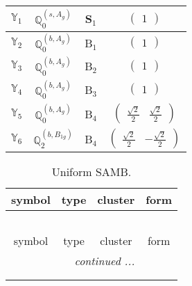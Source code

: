 \documentclass[fleqn,10pt,landscape]{article}
\begin{document}
\begin{itemize}
\begin{center}
\begin{longtable}{c|c|c|c}
$ \mathbb{Y}_{1} $ & $\mathbb{Q}_{0}^{(s,A_{g})}$ & S$_{1}$ & $\begin{pmatrix} 1 \end{pmatrix}$ \\ \hline
$ \mathbb{Y}_{2} $ & $\mathbb{Q}_{0}^{(b,A_{g})}$ & B$_{1}$ & $\begin{pmatrix} 1 \end{pmatrix}$ \\ \hline
$ \mathbb{Y}_{3} $ & $\mathbb{Q}_{0}^{(b,A_{g})}$ & B$_{2}$ & $\begin{pmatrix} 1 \end{pmatrix}$ \\ \hline
$ \mathbb{Y}_{4} $ & $\mathbb{Q}_{0}^{(b,A_{g})}$ & B$_{3}$ & $\begin{pmatrix} 1 \end{pmatrix}$ \\ \hline
$ \mathbb{Y}_{5} $ & $\mathbb{Q}_{0}^{(b,A_{g})}$ & B$_{4}$ & $\begin{pmatrix} \frac{\sqrt{2}}{2} & \frac{\sqrt{2}}{2} \end{pmatrix}$ \\
$ \mathbb{Y}_{6} $ & $\mathbb{Q}_{2}^{(b,B_{1g})}$ & B$_{4}$ & $\begin{pmatrix} \frac{\sqrt{2}}{2} & - \frac{\sqrt{2}}{2} \end{pmatrix}$ \\
\end{longtable}
\end{center}
\begin{center}
\renewcommand{\arraystretch}{1.3}
\begin{longtable}{c|c|c|c}
\caption{Uniform SAMB.}
 \\
 \hline \hline
symbol & type & cluster & form \\ \hline \endfirsthead

\multicolumn{3}{l}{\tablename\ \thetable{}} \\
 \hline \hline
symbol & type & cluster & form \\ \hline \endhead

 \hline \hline
\multicolumn{3}{r}{\footnotesize\it continued ...} \\ \endfoot

 \hline \hline
\multicolumn{3}{r}{} \\ \endlastfoot


\end{longtable}
\end{center}
\end{itemize}
\end{document}
